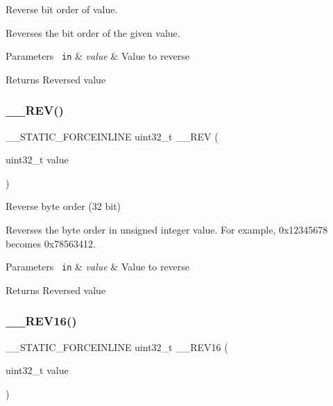 Reverse bit order of value. 

Reverses the bit order of the given value. 
\begin{DoxyParams}[1]{Parameters}
\mbox{\texttt{ in}}  & {\em value} & Value to reverse \\
\hline
\end{DoxyParams}
\begin{DoxyReturn}{Returns}
Reversed value 
\end{DoxyReturn}
\mbox{\label{group___c_m_s_i_s___core___instruction_interface_gadb92679719950635fba8b1b954072695}} 
\subsubsection{\texorpdfstring{\_\_REV()}{\_\_REV()}}
{\footnotesize\ttfamily \+\_\+\+\_\+\+S\+T\+A\+T\+I\+C\+\_\+\+F\+O\+R\+C\+E\+I\+N\+L\+I\+NE uint32\+\_\+t \+\_\+\+\_\+\+R\+EV (\begin{DoxyParamCaption}\item[{uint32\+\_\+t}]{value }\end{DoxyParamCaption})}



Reverse byte order (32 bit) 

Reverses the byte order in unsigned integer value. For example, 0x12345678 becomes 0x78563412. 
\begin{DoxyParams}[1]{Parameters}
\mbox{\texttt{ in}}  & {\em value} & Value to reverse \\
\hline
\end{DoxyParams}
\begin{DoxyReturn}{Returns}
Reversed value 
\end{DoxyReturn}
\mbox{\label{group___c_m_s_i_s___core___instruction_interface_gaa12aedd096506c9639c1581acd5c6a78}} 
\subsubsection{\texorpdfstring{\_\_REV16()}{\_\_REV16()}}
{\footnotesize\ttfamily \+\_\+\+\_\+\+S\+T\+A\+T\+I\+C\+\_\+\+F\+O\+R\+C\+E\+I\+N\+L\+I\+NE uint32\+\_\+t \+\_\+\+\_\+\+R\+E\+V16 (\begin{DoxyParamCaption}\item[{uint32\+\_\+t}]{value }\end{DoxyParamCaption})}



